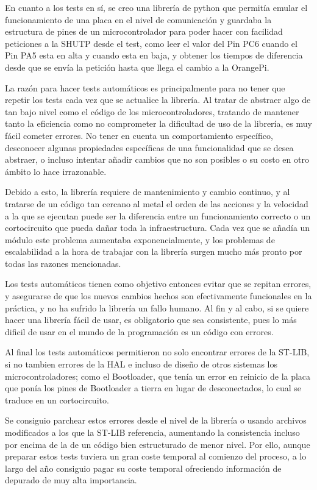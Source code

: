 \documentclass{report}
\begin{document}
\par \vspace{0.3cm}
En cuanto a los tests en sí, se creo una librería de python que permitía emular el funcionamiento de una placa en el nivel de comunicación y guardaba la estructura de pines de un microcontrolador para poder hacer con facilidad peticiones a la SHUTP desde el test, como leer el valor del Pin PC6 cuando el Pin PA5 esta en alta y cuando esta en baja, y obtener los tiempos de diferencia desde que se envía la petición hasta que llega el cambio a la OrangePi. 
\par \vspace{0.3cm}
La razón para hacer tests automáticos es principalmente para no tener que repetir los tests cada vez que se actualice la librería. Al tratar de abstraer algo de tan bajo nivel como el código de los microcontroladores, tratando de mantener tanto la eficiencia como no comprometer la dificultad de uso de la librería, es muy fácil cometer errores. No tener en cuenta un comportamiento específico, desconocer algunas propiedades específicas de una funcionalidad que se desea abstraer, o incluso intentar añadir cambios que no son posibles o su costo en otro ámbito lo hace irrazonable. 
\par
Debido a esto, la librería requiere de mantenimiento y cambio continuo, y al tratarse de un código tan cercano al metal el orden de las acciones y la velocidad a la que se ejecutan puede ser la diferencia entre un funcionamiento correcto o un cortocircuito que pueda dañar toda la infraestructura. Cada vez que se añadía un módulo este problema aumentaba exponencialmente, y los problemas de escalabilidad a la hora de trabajar con la librería surgen mucho más pronto por todas las razones mencionadas. 
\par \vspace{0.3cm}
Los tests automáticos tienen como objetivo entonces evitar que se repitan errores, y asegurarse de que los nuevos cambios hechos son efectivamente funcionales en la práctica, y no ha sufrido la librería un fallo humano. Al fin y al cabo, si se quiere hacer una librería fácil de usar, es obligatorio que sea consistente, pues lo más dificil de usar en el mundo de la programación es un código con errores. 
\par
Al final los tests automáticos permitieron no solo encontrar errores de la ST-LIB, si no tambien errores de la HAL e incluso de diseño de otros sistemas los microcontroladores; como el Bootloader, que tenía un error en reinicio de la placa que ponía los pines de Bootloader a tierra en lugar de desconectados, lo cual se traduce en un cortocircuito.
\par 
Se consiguio parchear estos errores desde el nivel de la librería o usando archivos modificados a los que la ST-LIB referencia, aumentando la consistencia incluso por encima de la de un código bien estructurado de menor nivel. Por ello, aunque preparar estos tests tuviera un gran coste temporal al comienzo del proceso, a lo largo del año consiguio pagar su coste temporal ofreciendo información de depurado de muy alta importancia. 
\newpage
\end{document}
